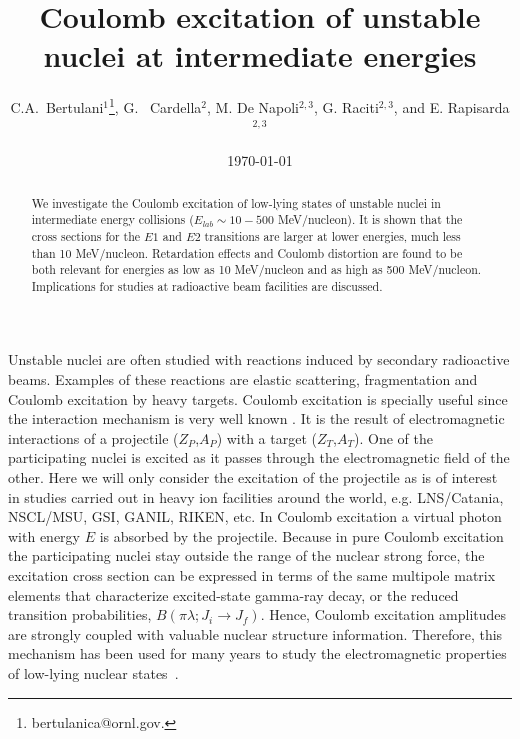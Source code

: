 \documentclass[prc,preprint,showpacs,showkeys,nofootinbib]{revtex4}%
\begin{document}
\title{Coulomb excitation of unstable nuclei at intermediate energies}
\author{C.A.~Bertulani$^{1}$\footnote{bertulanica@ornl.gov.},
G. ~Cardella$^{2}$, M. De Napoli$^{2,3}$, G. Raciti$^{2,3}$, and
E. Rapisarda$^{2,3}$}

\begin{abstract}
We investigate the Coulomb excitation of low-lying states of
unstable nuclei in intermediate energy collisions
($E_{lab}\sim10-500$ MeV/nucleon). It is shown that the cross
sections for the $E1$ and $E2$ transitions are larger at lower
energies, much less than 10 MeV/nucleon. Retardation effects and
Coulomb distortion are found to be both relevant for energies as low
as 10 MeV/nucleon and as high as 500 MeV/nucleon. Implications for
studies at radioactive beam facilities are discussed.

\end{abstract}
  \maketitle
\date{\today}


Unstable nuclei are often studied with reactions induced by
secondary radioactive beams. Examples of these reactions are elastic
scattering, fragmentation and Coulomb excitation by heavy targets.
Coulomb excitation is specially useful since the interaction
mechanism is very well known \cite{AW75}. It is the result of
electromagnetic interactions of a projectile ($Z_{P}$,$A_{P}$) with
a target ($Z_{T}$,$A_{T}$). One of the participating nuclei is
excited as it passes through the electromagnetic field of the other.
Here we will only consider the excitation of the projectile as is of
interest in studies carried out in heavy ion facilities around the
world, e.g. LNS/Catania, NSCL/MSU, GSI, GANIL, RIKEN, etc. In
Coulomb excitation a virtual photon with energy $E$ is absorbed by
the projectile. Because in pure Coulomb excitation the participating
nuclei stay outside the range of the nuclear strong force, the
excitation cross section can be expressed in terms of the same
multipole matrix elements that characterize excited-state gamma-ray
decay, or the reduced transition probabilities,
$B(\pi\lambda;J_{i}\rightarrow J_{f})$. Hence, Coulomb excitation
amplitudes are strongly coupled with valuable nuclear structure
information. Therefore, this mechanism has been used for many years
to study the electromagnetic properties of low-lying nuclear
states~\cite{AW75}.
\end{document}
